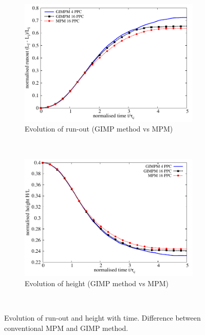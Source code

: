 \begin{figure}[tbhp]
	\centering
	\begin{subfigure}[b]{0.95\textwidth}
		\centering
		\includegraphics[width=0.95\textwidth]{Runout_MPM_GIMPM}
		\caption{Evolution of run-out (GIMP method vs MPM)}
		\label{fig:Runout_MPM_GIMPM}
	\end{subfigure} \\
	\begin{subfigure}[b]{0.95\textwidth}
		\centering 
		\includegraphics[width=0.95\textwidth]{Height_MPM_GIMP}
		\caption{Evolution of height (GIMP method vs MPM)}
		\label{fig:Height_MPM_GIMP}
	\end{subfigure} \\
	\caption{Evolution of run-out and height with time. Difference between 
	conventional MPM and GIMP method.}
	\label{fig:MPM_GIMP}
\end{figure}


